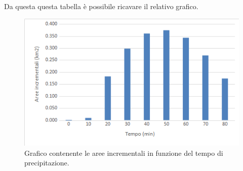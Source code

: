 Da questa questa tabella è possibile ricavare il relativo grafico.
\begin{figure}[H]  \centering
    \includegraphics[scale=0.75]{immagini/aree_incrementali_funzione_tempo.png}
    \caption{Grafico contenente le aree incrementali in funzione del tempo di precipitazione.}
    \label{aree_incrementali_funzione_tempo}
\end{figure}

